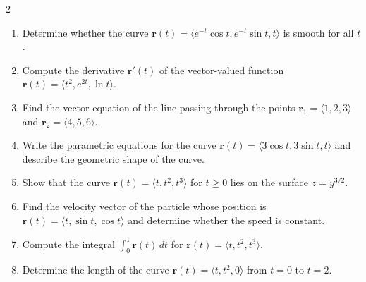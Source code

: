 \begin{multicols}{2}

\begin{enumerate}
    \item Determine whether the curve \( \mathbf{r}(t) = \langle e^{-t}\cos t, e^{-t}\sin t, t \rangle \) is smooth for all \( t \).
    \item Compute the derivative \( \mathbf{r}'(t) \) of the vector-valued function \( \mathbf{r}(t) = \langle t^2, e^{2t}, \ln t \rangle \).
    \item Find the vector equation of the line passing through the points \( \mathbf{r}_1 = \langle 1, 2, 3 \rangle \) and \( \mathbf{r}_2 = \langle 4, 5, 6 \rangle \).
    \item Write the parametric equations for the curve \( \mathbf{r}(t) = \langle 3\cos t, 3\sin t, t \rangle \) and describe the geometric shape of the curve.
    \item Show that the curve \( \mathbf{r}(t) = \langle t, t^2, t^3 \rangle \) for \( t \geq 0 \) lies on the surface \( z = y^{3/2} \).
    \item Find the velocity vector of the particle whose position is \( \mathbf{r}(t) = \langle t, \sin t, \cos t \rangle \) and determine whether the speed is constant.
    \item Compute the integral \( \int_0^1 \mathbf{r}(t) \, dt \) for \( \mathbf{r}(t) = \langle t, t^2, t^3 \rangle \).
    \item Determine the length of the curve \( \mathbf{r}(t) = \langle t, t^2, 0 \rangle \) from \( t = 0 \) to \( t = 2 \).


\end{enumerate}
\end{multicols}
